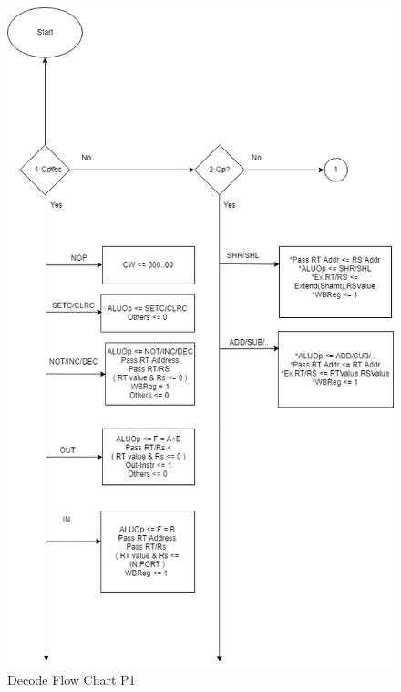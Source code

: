 \documentclass[12pt]{article}
\theoremstyle{plain}
\theoremstyle{definition}
\begin{document}
\begin{figure}
    \centering
    \includegraphics[height=0.9\textheight,keepaspectratio]{Diagrams/decode_1.png}
    \caption{Decode Flow Chart P1}
    \label{decode-chart1}
\end{figure}
\end{document}
